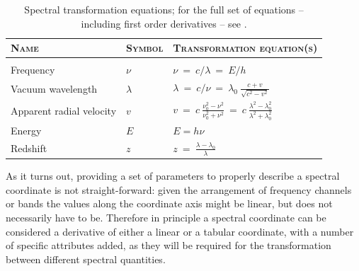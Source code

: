 \documentclass[a4paper,10pt,bibtotoc]{scrreprt}
\begin{document}
\begin{table}[htbp]
  \centering
  \begin{tabular}{lll}
    \hline
    \textsc{Name} & \textsc{Symbol} & \textsc{Transformation equation(s)} \\
    \hline \hline
    \\[-1mm]
    Frequency & $\nu$ & $\displaystyle \nu \ = \ c/\lambda \ = \ E/h$ \\[3mm]
    Vacuum wavelength & $\lambda$ & $\displaystyle \lambda\ = \ c/\nu \ =
    \ \lambda_{0} \ \frac{c+v}{\sqrt{c^2 - v^2}}$ \\[3mm]
    Apparent radial velocity & $v$ & $\displaystyle v \ = \ c \ 
    \frac{\nu_{0}^{2} - \nu^{2}}{\nu_{0}^{2} + \nu^{2}} \ = \ c \ 
    \frac{\lambda^{2} - \lambda_{0}^{2}}{\lambda^{2} +
      \lambda_{0}^{2}} $ \\[4mm]
    \hbox{Energy} & $E$ & $\displaystyle E = h \nu$ \\[3mm]
    \hbox{Redshift} & $z$ & $\displaystyle z \ = \
    \frac{\lambda-\lambda_{0}}{\lambda}$ \\[2mm]
    \hline
  \end{tabular}
  \caption[Spectral transformation equations]{Spectral transformation equations; for the full set
    of equations -- including first order derivatives -- see \cite{fits.paper3}.}
  \label{tab:spectral transformations}
\end{table}

As it turns out, providing a set of parameters to properly describe a spectral
coordinate is not straight-forward: given the arrangement of frequency channels
or bands the values along the coordinate axis might be linear, but
does not necessarily have to be. Therefore in principle a spectral
coordinate can be considered a derivative of either a linear or a
tabular coordinate, with a number of specific attributes added, as
they will be required for the transformation between different
spectral quantities.


\end{document}
